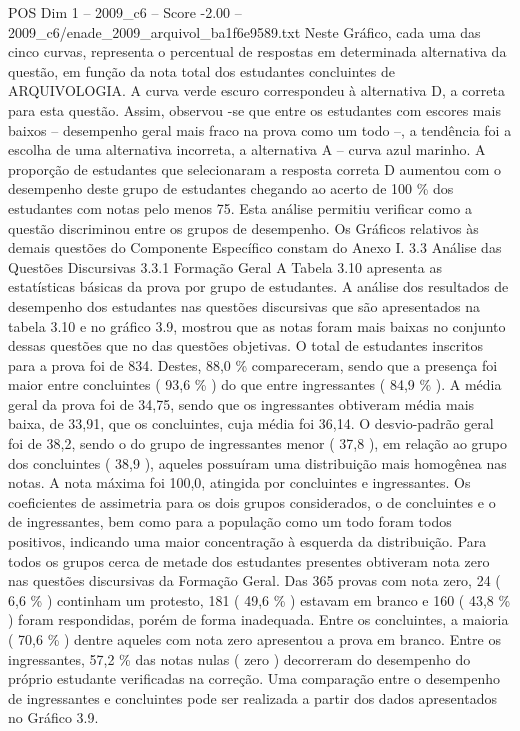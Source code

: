 \begin{textsample}{POS Dim 1 – 2009\_c6 – Score -2.00 – 2009\_c6/enade\_2009\_arquivol\_ba1f6e9589.txt}
Neste Gráfico, cada uma das cinco curvas, representa o percentual de respostas em determinada alternativa da questão, em função da nota total dos estudantes concluintes de ARQUIVOLOGIA.
A curva verde escuro correspondeu à alternativa D, a correta para esta questão.
Assim, observou -se que entre os estudantes com escores mais baixos – desempenho geral mais fraco na prova como um todo –, a tendência foi a escolha de uma alternativa incorreta, a alternativa A – curva azul marinho.
A proporção de estudantes que selecionaram a resposta correta D aumentou com o desempenho deste grupo de estudantes chegando ao acerto de 100 \% dos estudantes com notas pelo menos 75.
Esta análise permitiu verificar como a questão discriminou entre os grupos de desempenho.
Os Gráficos relativos às demais questões do Componente Específico constam do Anexo I. 3.3 Análise das Questões Discursivas 3.3.1 Formação Geral A Tabela 3.10 apresenta as estatísticas básicas da prova por grupo de estudantes.
A análise dos resultados de desempenho dos estudantes nas questões discursivas que são apresentados na tabela 3.10 e no gráfico 3.9, mostrou que as notas foram mais baixas no conjunto dessas questões que no das questões objetivas.
O total de estudantes inscritos para a prova foi de 834.
Destes, 88,0 \% compareceram, sendo que a presença foi maior entre concluintes ( 93,6 \% ) do que entre ingressantes ( 84,9 \% ).
A média geral da prova foi de 34,75, sendo que os ingressantes obtiveram média mais baixa, de 33,91, que os concluintes, cuja média foi 36,14.
O desvio-padrão geral foi de 38,2, sendo o do grupo de ingressantes menor ( 37,8 ), em relação ao grupo dos concluintes ( 38,9 ), aqueles possuíram uma distribuição mais homogênea nas notas.
A nota máxima foi 100,0, atingida por concluintes e ingressantes.
Os coeficientes de assimetria para os dois grupos considerados, o de concluintes e o de ingressantes, bem como para a população como um todo foram todos positivos, indicando uma maior concentração à esquerda da distribuição.
Para todos os grupos cerca de metade dos estudantes presentes obtiveram nota zero nas questões discursivas da Formação Geral.
Das 365 provas com nota zero, 24 ( 6,6 \% ) continham um protesto, 181 ( 49,6 \% ) estavam em branco e 160 ( 43,8 \% ) foram respondidas, porém de forma inadequada.
Entre os concluintes, a maioria ( 70,6 \% ) dentre aqueles com nota zero apresentou a prova em branco.
Entre os ingressantes, 57,2 \% das notas nulas ( zero ) decorreram do desempenho do próprio estudante verificadas na correção.
Uma comparação entre o desempenho de ingressantes e concluintes pode ser realizada a partir dos dados apresentados no Gráfico 3.9.

\end{textsample}
